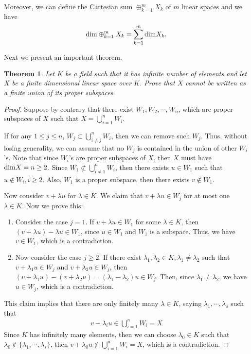 \documentclass[11pt]{book}
\newtheorem{theorem}{Theorem}[section]
\theoremstyle{definition}
\numberwithin{equation}{chapter}
\begin{document}
Moreover, we can define the Cartesian sum $\oplus^m_{k=1}X_k$ of $m$ linear spaces and we have 
\begin{align*}
    {\rm dim}\oplus^m_{k=1}X_k = \sum^m_{k=1}{\rm dim}X_k.
\end{align*}

\medskip

Next we present an important theorem.

\medskip

\begin{theorem}
Let $K$ be a field such that it has infinite number of elements and let $X$ be a finite dimensional linear space over $K$. Prove that $X$ cannot be written as a finite union of its proper subspaces.
\end{theorem}
\begin{proof}
Suppose by contrary that there exist $W_1, W_2,\cdots, W_n$, which are proper subspaces of $X$ such that $X = \bigcup^n_{i=1}W_i$. 

If for any $1\leq j\leq n$, $W_j\subset \bigcup^n_{i\neq j}W_i$, then we can remove such $W_j$. Thus, without losing generality, we can assume that no $W_j$ is contained in the union of other $W_i$'s. Note that since $W_i$'s are proper subspaces of $X$, then $X$ must have ${\rm dim}X = n \geq 2$. Since $W_1\not\subset \bigcup^n_{i\neq 1}W_i$, then there exists $u\in W_1$ such that $u\notin W_i, i\geq 2$. Also, $W_1$ is a proper subspace, then there exists $v\notin W_1$. 

Now consider $v + \lambda u$ for $\lambda\in K$. We claim that $v + \lambda u\in W_j$ for at most one $\lambda\in K$. Now we prove this:
\begin{enumerate}[label=(\alph*)]
    \item Consider the case $j=1$. If $v + \lambda u\in W_1$ for some $\lambda\in K$, then $(v + \lambda u) - \lambda u\in W_1$, since $u\in W_1$ and $W_1$ is a subspace. Thus, we have $v\in W_1$, which is a contradiction.
    \item Now consider the case $j\geq 2$. If there exist $\lambda_1, \lambda_2\in K, \lambda_1\neq\lambda_2$ such that $v+\lambda_1 u\in W_j$ and $v+\lambda_2 u\in W_j$, then $(v+\lambda_1 u) - (v+\lambda_2 u) = (\lambda_1 - \lambda_2)u \in W_j$. Then, since $\lambda_1\neq\lambda_2$, we have $u\in W_j$, which is a contradiction.
\end{enumerate}

This claim implies that there are only finitely many $\lambda\in K$, saying $\lambda_1, \cdots, \lambda_s$ such that 
\begin{align*}
    v+\lambda_i u \in \bigcup^n_{i=1}W_i = X
\end{align*}
Since $K$ has infinitely many elements, then we can choose $\lambda_0\in K$ such that $\lambda_0\notin \{\lambda_1, \cdots, \lambda_s\}$, then $v+\lambda_0 u\notin \bigcup^n_{i=1}W_i = X$, which is a contradiction.
\end{proof}
\end{document}
